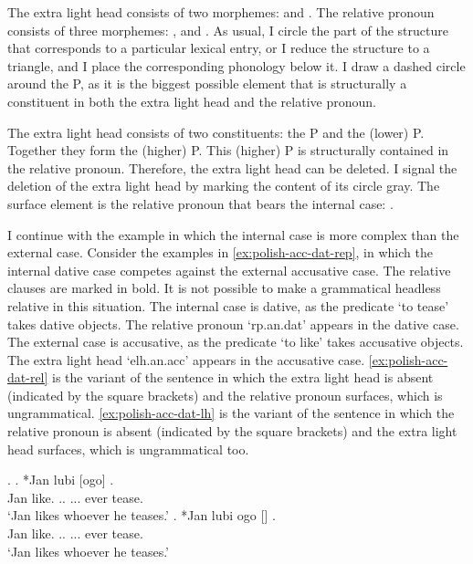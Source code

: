 The extra light head consists of two morphemes:  and .
The relative pronoun consists of three morphemes: ,  and .
As usual, I circle the part of the structure that corresponds to a particular lexical entry, or I reduce the structure to a triangle, and I place the corresponding phonology below it.
I draw a dashed circle around the P, as it is the biggest possible element that is structurally a constituent in both the extra light head and the relative pronoun.

The extra light head consists of two constituents: the P and the (lower) P. Together they form the (higher) P.
This (higher) P is structurally contained in the relative pronoun. Therefore, the extra light head can be deleted. I signal the deletion of the extra light head by marking the content of its circle gray.
The surface element is the relative pronoun that bears the internal case: .

I continue with the example in which the internal case is more complex than the external case.
Consider the examples in \ref{ex:polish-acc-dat-rep}, in which the internal dative case competes against the external accusative case. The relative clauses are marked in bold. It is not possible to make a grammatical headless relative in this situation.
The internal case is dative, as the predicate  `to tease' takes dative objects. The relative pronoun  `\ac{rp}.\ac{an}.\ac{dat}' appears in the dative case.
The external case is accusative, as the predicate  `to like' takes accusative objects. The extra light head  `\ac{elh}.\ac{an}.\ac{acc}' appears in the accusative case.
\ref{ex:polish-acc-dat-rel} is the variant of the sentence in which the extra light head is absent (indicated by the square brackets) and the relative pronoun surfaces, which is ungrammatical.
\ref{ex:polish-acc-dat-lh} is the variant of the sentence in which the relative pronoun is absent (indicated by the square brackets) and the extra light head surfaces, which is ungrammatical too.

\ex.\label{ex:polish-acc-dat-rep}
\ag. *Jan lubi [ogo]   .\\
Jan like.\scsub{[acc]} .. ... ever tease.\scsub{[dat]}\\
`Jan likes whoever he teases.' \label{ex:polish-acc-dat-rel}
\bg. *Jan lubi ogo []  .\\
Jan like.\scsub{[acc]} .. ... ever tease.\scsub{[dat]}\\
`Jan likes whoever he teases.' \label{ex:polish-acc-dat-lh}

